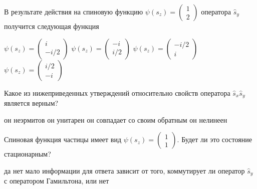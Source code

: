 \documentclass[11pt,a4paper]{exam}
\begin{document}
\begin{questions}
\question В результате действия на спиновую функцию $\psi ({s_z}) = \left( {\begin{array}{*{20}{c}}
1\\
2
\end{array}} \right)$ оператора ${\hat s_y}$ получится следующая функция
\begin{choices}
\choice $\psi ({s_z}) = \left( {\begin{array}{*{20}{c}}
i\\
{ - i/2}
\end{array}} \right)$   
\choice $\psi ({s_z}) = \left( {\begin{array}{*{20}{c}}
{ - i}\\
{i/2}
\end{array}} \right)$   
\choice $\psi ({s_z}) = \left( {\begin{array}{*{20}{c}}
{ - i/2}\\
i
\end{array}} \right)$   
\choice $\psi ({s_z}) = \left( {\begin{array}{*{20}{c}}
{i/2}\\
{ - i}
\end{array}} \right)$
\end{choices}

\question Какое из нижеприведенных утверждений относительно свойств оператора ${\hat s_x}{\hat s_y}$ является верным?
\begin{choices}
\choice он неэрмитов            
\choice он унитарен 
\choice он совпадает со своим обратным   
\choice он нелинеен
\end{choices}

\question Спиновая функция частицы имеет вид $\psi ({s_z}) = \left( {\begin{array}{*{20}{c}}
1\\
1
\end{array}} \right)$. Будет ли это состояние стационарным?
\begin{choices}
\choice да
\choice нет      
\choice мало информации для ответа
\choice зависит от того, коммутирует ли оператор ${\hat s_y}$ с оператором Гамильтона, или нет
\end{choices}


\end{questions}
\end{document}
